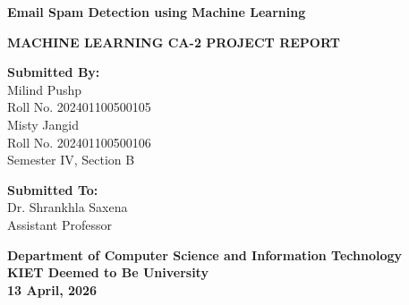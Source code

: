 \documentclass[12pt, a4paper]{article}
\begin{document}
\begin{titlepage}
    \centering
    \vspace*{1cm}
    
    \Huge
    \textbf{Email Spam Detection using Machine Learning}
    
    \vspace{1.5cm}
    
    \Large
    \textbf{MACHINE LEARNING CA-2 PROJECT REPORT}
    
    \vspace{2cm}
    
    \begin{minipage}{0.45\textwidth}
        \begin{flushleft} \large
            \textbf{Submitted By:}\\
            Milind Pushp \\ Roll No. 202401100500105\\
            Misty Jangid \\ Roll No. 202401100500106\\
            Semester IV, Section B
        \end{flushleft}
    \end{minipage}
    \hfill
    \begin{minipage}{0.45\textwidth}
        \begin{flushright} \large
            \textbf{Submitted To:}\\
            Dr. Shrankhla Saxena\\
            Assistant Professor
        \end{flushright}
    \end{minipage}
    
    \vfill
    
    \Large
    \textbf{Department of Computer Science and Information Technology}\\
    \textbf{KIET Deemed to Be University}\\
    \vspace{0.8cm}
    \textbf{13 April, 2026}
    
\end{titlepage}
\end{document}
